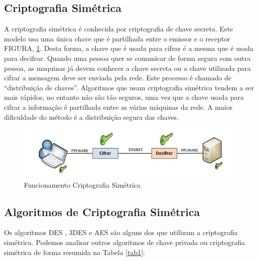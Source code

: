 \documentclass[12pt]{article}
\begin{document}
\subsection{Criptografia Simétrica}
A criptografia simétrica é conhecida por criptografia de chave secreta. Este modelo usa uma única chave que é partilhada entre o emissor e o receptor FIGURA, \ref{cripto1}. Desta forma, a chave que é usada para cifrar é a mesma que é usada para decifrar. Quando  uma pessoa  quer  se  comunicar  de  forma  segura  com  outra  pessoa, as maquinas já devem conhecer a chave secreta ou a chave utilizada para cifrar a mensagem deve ser enviada pela rede. Este processo é chamado de “distribuição de chaves”. Algoritmos que usam criptografia simétrica tendem a ser mais rápidos, no entanto não são tão seguros, uma vez que a chave usada para cifrar a informação é partilhada entre as várias máquinas da rede. A maior dificuldade do método é a distribuição segura das chaves\cite{BURNETT:02}.

 \begin{figure}[!h]
	\centering
	\includegraphics[]{Simetrica.JPG}
	\caption{Funcionamento Criptografia Simétrica}
	\label{cripto1}
\end{figure}

\subsection{Algoritmos de Criptografia Simétrica}
    Os algoritmos  DES , 3DES e AES são alguns dos que utilizam a criptografia simétrica. Podemos analisar outros algoritmos  de  chave  privada  ou  criptografia  simétrica  de  forma  resumida  na Tabela \ref{tab1}:
    
\end{document}
